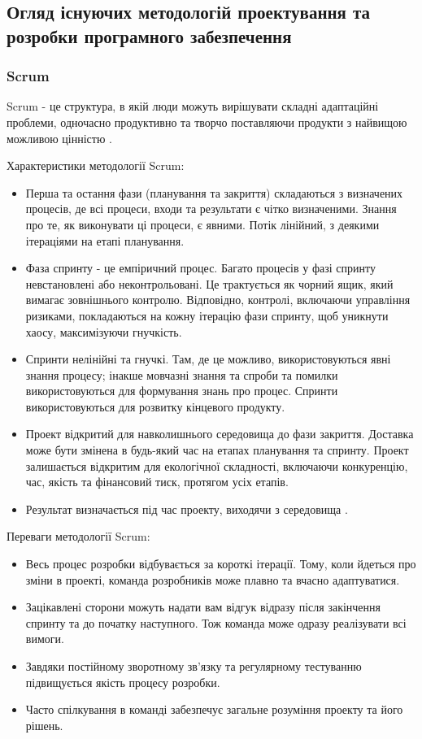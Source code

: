 \subsection{Огляд існуючих методологій проектування та розробки програмного забезпечення}

\subsubsection{Scrum}
Scrum - це структура, в якій люди можуть вирішувати складні адаптаційні
проблеми, одночасно продуктивно та творчо поставляючи продукти з
найвищою можливою цінністю \cite{what-is-scrum,scrum-guide}.

Характеристики методології Scrum:
\begin{itemize}
    \item Перша та остання фази (планування та закриття) складаються
      з визначених процесів, де всі процеси, входи та результати є чітко
      визначеними. Знання про те, як виконувати ці процеси, є явними.
      Потік лінійний, з деякими ітераціями на етапі планування.
    \item Фаза спринту - це емпіричний процес. Багато процесів
      у фазі спринту невстановлені або неконтрольовані. Це трактується
      як чорний ящик, який вимагає зовнішнього контролю. Відповідно,
      контролі, включаючи управління ризиками, покладаються на кожну
      ітерацію фази спринту, щоб уникнути хаосу, максимізуючи гнучкість.
    \item Спринти нелінійні та гнучкі. Там, де це можливо,
      використовуються явні знання процесу; інакше мовчазні знання
      та спроби та помилки використовуються для формування знань про процес.
      Спринти використовуються для розвитку кінцевого продукту.
    \item Проект відкритий для навколишнього середовища до фази закриття.
      Доставка може бути змінена в будь-який час на етапах планування та спринту.
      Проект залишається відкритим для екологічної складності, включаючи конкуренцію,
      час, якість та фінансовий тиск, протягом усіх етапів.
    \item Результат визначається під час проекту, виходячи з середовища \cite{schwaber-scrum}.
\end{itemize}

Переваги методології Scrum:
\begin{itemize}
    \item Весь процес розробки відбувається за короткі ітерації.
      Тому, коли йдеться про зміни в проекті, команда розробників
      може плавно та вчасно адаптуватися.
    \item Зацікавлені сторони можуть надати вам відгук відразу після
      закінчення спринту та до початку наступного.
      Тож команда може одразу реалізувати всі вимоги.
    \item Завдяки постійному зворотному зв'язку та регулярному 
      тестуванню підвищується якість процесу розробки.
    \item Часто спілкування в команді забезпечує 
      загальне розуміння проекту та його рішень.
\end{itemize}

